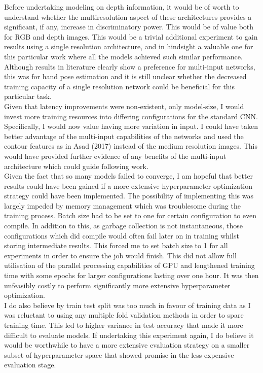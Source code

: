 \documentclass{article}
\begin{document}
Before undertaking modeling on depth information, it would be of worth to understand whether the multiresolution aspect of these architectures provides a significant, if any, increase in discriminatory power. This would be of value both for RGB and depth images. This would be a trivial additional experiment to gain results using a single resolution architecture, and in hindsight a valuable one for this particular work where all the models achieved such similar performance. Although results in literature clearly show a preference for multi-input networks, this was for hand pose estimation and it is still unclear whether the decreased training capacity of a single resolution network could be beneficial for this particular task. \\

Given that latency improvements were non-existent, only model-size, I would invest more training resources into differing configurations for the standard CNN. Specifically, I would now value having more variation in input. I could have taken better advantage of the multi-input capabilities of the networks and used the contour features as in Asad (2017) instead of the medium resolution images. This would have provided further evidence of any benefits of the multi-input architecture which could guide following work. \\

Given the fact that so many models failed to converge, I am hopeful that better results could have been gained if a more extensive hyperparameter optimization strategy could have been implemented. The possibility of implementing this was largely impeded  by memory management which was troublesome during the training process. Batch size had to be set to one for certain configuration to even compile. In addition to this, as garbage collection is not instantaneous, those configurations which did compile would often fail later on in training whilst storing intermediate results. This forced me to set batch size to 1 for all experiments in order to ensure the job would finish. This did not allow full utilisation of the parallel processing capabilities of GPU and lengthened training time with some epochs for larger configurations lasting over one hour. It was then unfeasibly costly to perform significantly more extensive hyperparameter optimization. \\

I do also believe by train test split was too much in favour of training data as I was reluctant to using any multiple fold validation methods in order to spare training time. This led to higher variance in test accuracy that made it more difficult to evaluate models. If undertaking this experiment again, I do believe it would be worthwhile to have a more extensive evaluation strategy on a smaller subset of hyperparameter space that showed promise in the less expensive evaluation stage. \\
\end{document}
